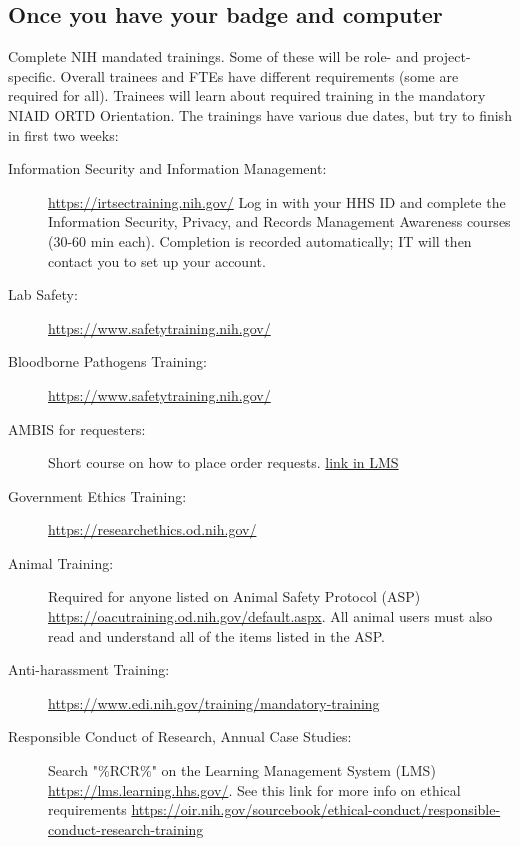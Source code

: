 \documentclass[10pt, letterpaper, twocolumn]{article} %
\begin{document}
\subsection{Once you have your badge and computer}
Complete NIH mandated trainings. Some of these will be role- and project-specific. Overall trainees and FTEs have different requirements (some are required for all).  Trainees will learn about required training in the mandatory NIAID ORTD Orientation.
The trainings have various due dates, but try to finish in first two weeks:
\begin{description}
\item[Information Security and Information Management:]\href{https://irtsectraining.nih.gov/}{https://irtsectraining.nih.gov/} Log in with your HHS ID and complete the Information Security, Privacy, and Records Management Awareness courses (30-60 min each). Completion is recorded automatically; IT will then contact you to set up your account.
\item[Lab Safety:]\href{https://www.safetytraining.nih.gov/}{https://www.safetytraining.nih.gov/}
\item[Bloodborne Pathogens Training:]\href{https://www.safetytraining.nih.gov/}{https://www.safetytraining.nih.gov/}
\item[AMBIS for requesters:] Short course on how to place order requests. \href{https://lms.learning.hhs.gov/Saba/Web_wdk/Main/learning/learningOfferingDetails.rdf}{link in LMS}
\item[Government Ethics Training:]\href{https://researchethics.od.nih.gov/}{https://researchethics.od.nih.gov/}
\item[Animal Training:]Required for anyone listed on Animal Safety Protocol (ASP) \href{https://oacutraining.od.nih.gov/default.aspx}{https://oacutraining.od.nih.gov/default.aspx}. All animal users must also read and understand all of the items listed in the ASP.
\item[Anti-harassment Training:]\href{https://www.edi.nih.gov/training/mandatory-training}{https://www.edi.nih.gov/training/mandatory-training}
\item[Responsible Conduct of Research, Annual Case Studies:] Search "\%RCR\%" on the Learning Management System (LMS) \href{https://lms.learning.hhs.gov/}{https://lms.learning.hhs.gov/}. See this link for more info on ethical requirements \href{https://oir.nih.gov/sourcebook/ethical-conduct/responsible-conduct-research-training}{https://oir.nih.gov/sourcebook/ethical-conduct/responsible-conduct-research-training}
\end{description}
\end{document}

